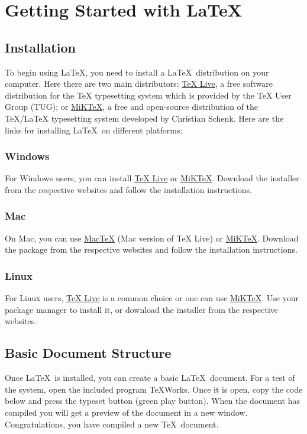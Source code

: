 \chapter{Getting Started with \LaTeX}\label{ch:gettingstarted}
	\section{Installation}
		To begin using \LaTeX, you need to install a \LaTeX\ distribution on your computer.
		Here there are two main distributors: \href{https://tug.org/texlive}{TeX Live}, a free software distribution for the TeX typesetting system which is provided by the TeX User Group (TUG); or \href{https://miktex.org/}{MiKTeX}, a free and open-source distribution of the TeX/LaTeX typesetting system developed by Christian Schenk.
		Here are the links for installing \LaTeX\ on different platforms:

		\subsection{Windows}
			For Windows users, you can install \href{https://tug.org/texlive/windows.html}{TeX Live} or \href{https://miktex.org/download}{MiKTeX}. 
			Download the installer from the respective websites and follow the installation instructions.

		\subsection{Mac}
			On Mac, you can use \href{https://tug.org/mactex/}{MacTeX} (Mac version of TeX Live) or \href{https://miktex.org/download}{MiKTeX}. 
			Download the package from the respective websites and follow the installation instructions.

		\subsection{Linux}
			For Linux users, \href{https://tug.org/texlive/quickinstall.html}{TeX Live} is a common choice or one can use \href{https://miktex.org/download}{MiKTeX}. 
			Use your package manager to install it, or download the installer from the respective websites.

	\section{Basic Document Structure}
		Once \LaTeX\ is installed, you can create a basic \LaTeX\ document.
		For a test of the system, open the included program TeXWorks.
		Once it is open, copy the code below and press the typeset button (green play button).
		When the document has compiled you will get a preview of the document in a new window.
		Congratulations, you have compiled a new \TeX\ document.

